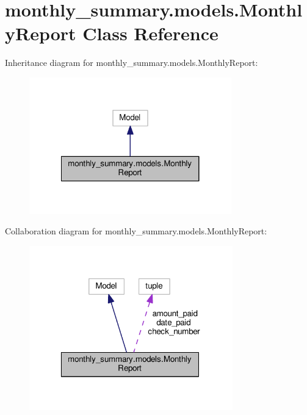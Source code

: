 \hypertarget{classmonthly__summary_1_1models_1_1MonthlyReport}{\section{monthly\-\_\-summary.\-models.\-Monthly\-Report Class Reference}
\label{classmonthly__summary_1_1models_1_1MonthlyReport}
}


Inheritance diagram for monthly\-\_\-summary.\-models.\-Monthly\-Report\-:
\nopagebreak
\begin{figure}[H]
\begin{center}
\leavevmode
\includegraphics[width=248pt]{classmonthly__summary_1_1models_1_1MonthlyReport__inherit__graph}
\end{center}
\end{figure}


Collaboration diagram for monthly\-\_\-summary.\-models.\-Monthly\-Report\-:
\nopagebreak
\begin{figure}[H]
\begin{center}
\leavevmode
\includegraphics[width=250pt]{classmonthly__summary_1_1models_1_1MonthlyReport__coll__graph}
\end{center}
\end{figure}
